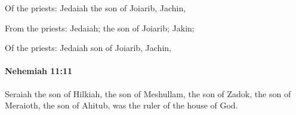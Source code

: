 			\begin{versebox}
					\item[BHS] 
					\item[LXX] 
					\item[ASV] Of the priests: Jedaiah the son of Joiarib, Jachin,
					\item[NIV] From the priests: Jedaiah; the son of Joiarib; Jakin;
					\item[NRSV] Of the priests: Jedaiah son of Joiarib, Jachin,
			\end{versebox}

		\paragraph{Nehemiah 11:11} %
			\label{NEHEMIAH-11-11}

			Seraiah the son of Hilkiah, the son of Meshullam, the son of Zadok, the son of Meraioth, the son of Ahitub, was the ruler of the house of God.

